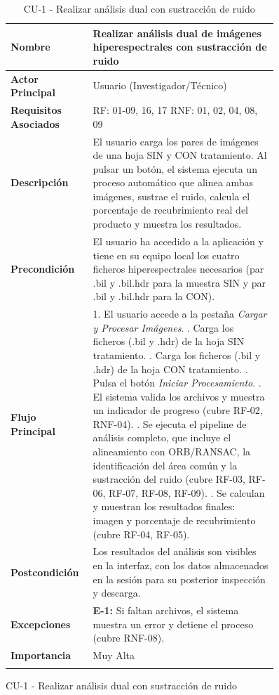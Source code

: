 \begin{figure}[H]
\begin{longtable}{p{0.25\linewidth} p{0.65\linewidth}}
    \textbf{Nombre} & Realizar análisis dual de imágenes hiperespectrales con sustracción de ruido \\
    \midrule
    \textbf{Actor Principal} & Usuario (Investigador/Técnico) \\
    \midrule
    \textbf{Requisitos Asociados} & RF: 01-09, 16, 17 \newline RNF: 01, 02, 04, 08, 09 \\
    \midrule
    \textbf{Descripción} & El usuario carga los pares de imágenes de una hoja SIN y CON tratamiento. Al pulsar un botón, el sistema ejecuta un proceso automático que alinea ambas imágenes, sustrae el ruido, calcula el porcentaje de recubrimiento real del producto y muestra los resultados. \\
    \midrule
    \textbf{Precondición} & El usuario ha accedido a la aplicación y tiene en su equipo local los cuatro ficheros hiperespectrales necesarios (par .bil y .bil.hdr para la muestra SIN y par .bil y .bil.hdr para la CON). \\
    \midrule
    \textbf{Flujo Principal} &
        1. El usuario accede a la pestaña   \textit{Cargar y Procesar Imágenes}. \newline
        2. Carga los ficheros (.bil y .hdr) de la hoja SIN tratamiento. \newline
        3. Carga los ficheros (.bil y .hdr) de la hoja CON tratamiento. \newline
        4. Pulsa el botón \textit{Iniciar Procesamiento}. \newline
        5. El sistema valida los archivos y muestra un indicador de progreso (cubre RF-02, RNF-04). \newline
        6. Se ejecuta el pipeline de análisis completo, que incluye el alineamiento con ORB/RANSAC, la identificación del área común y la sustracción del ruido (cubre RF-03, RF-06, RF-07, RF-08, RF-09). \newline
        7. Se calculan y muestran los resultados finales: imagen y porcentaje de recubrimiento (cubre RF-04, RF-05). \\
    \midrule
    \textbf{Postcondición} & Los resultados del análisis son visibles en la interfaz, con los datos almacenados en la sesión para su posterior inspección y descarga. \\
    \midrule
    \textbf{Excepciones} & \textbf{E-1:} Si faltan archivos, el sistema muestra un error y detiene el proceso (cubre RNF-08). \\
    \midrule
    \textbf{Importancia} & Muy Alta \\
    \caption{CU-1 - Realizar análisis dual con sustracción de ruido} \label{tab:cu1} \\
\end{longtable}
\end{figure}


